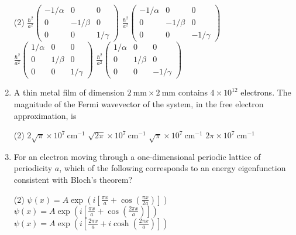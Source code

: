 \begin{enumerate}
	{}
\begin{tasks}(2)
\task[\textbf{A.}] $\frac{\hbar^{2}}{a^{2}}\left(\begin{array}{ccc}-1 / \alpha & 0 & 0 \\ 0 & -1 / \beta & 0 \\ 0 & 0 & 1 / \gamma\end{array}\right)$
\task[\textbf{B.}]  $\frac{\hbar^{2}}{a^{2}}\left(\begin{array}{ccc}-1 / \alpha & 0 & 0 \\ 0 & -1 / \beta & 0 \\ 0 & 0 & -1 / \gamma\end{array}\right)$
\task[\textbf{C.}] $\frac{\hbar^{2}}{a^{2}}\left(\begin{array}{ccc}1 / \alpha & 0 & 0 \\ 0 & 1 / \beta & 0 \\ 0 & 0 & 1 / \gamma\end{array}\right)$
\task[\textbf{D.}] $\frac{\hbar^{2}}{a^{2}}\left(\begin{array}{ccc}1 / \alpha & 0 & 0 \\ 0 & 1 / \beta & 0 \\ 0 & 0 & -1 / \gamma\end{array}\right)$
\end{tasks}
	\item A thin metal film of dimension $2 \mathrm{~mm} \times 2 \mathrm{~mm}$ contains $4 \times 10^{12}$ electrons. The magnitude of the Fermi wavevector of the system, in the free electron approximation, is 
	{}
\begin{tasks}(2)
\task[\textbf{A.}] $2 \sqrt{\pi} \times 10^{7} \mathrm{~cm}^{-1}$
\task[\textbf{B.}] $\sqrt{2 \pi} \times 10^{7} \mathrm{~cm}^{-1}$
\task[\textbf{C.}] $\sqrt{\pi} \times 10^{7} \mathrm{~cm}^{-1}$
\task[\textbf{D.}] $2 \pi \times 10^{7} \mathrm{~cm}^{-1}$
\end{tasks}
	\item For an electron moving through a one-dimensional periodic lattice of periodicity $a$, which of the following corresponds to an energy eigenfunction consistent with Bloch's theorem?
	{}
\begin{tasks}(2)
\task[\textbf{A.}] $\psi(x)=A \exp \left(i\left[\frac{\pi x}{a}+\cos \left(\frac{\pi x}{2 a}\right)\right]\right)$
\task[\textbf{B.}] $\psi(x)=A \exp \left(i\left[\frac{\pi x}{a}+\cos \left(\frac{2 \pi x}{a}\right)\right]\right)$
\task[\textbf{C.}] $\psi(x)=A \exp \left(i\left[\frac{2 \pi x}{a}+i \cosh \left(\frac{2 \pi x}{a}\right)\right]\right)$

\end{tasks}
\end{enumerate}
